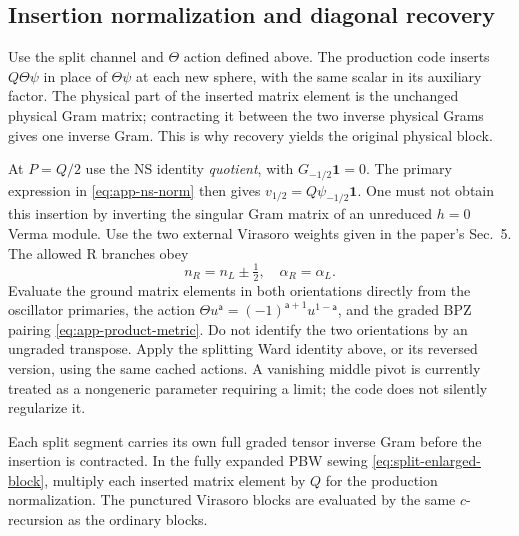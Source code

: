 \subsection{Insertion normalization and diagonal recovery}
\label{app:insertion}

Use the split channel and $\Theta$ action defined above. The
production code inserts $Q\Theta\psi$ in place of
$\Theta\psi$ at each new sphere, with the same scalar in its
auxiliary factor. The physical part of the inserted matrix element
is the unchanged physical Gram matrix;
contracting it between the two inverse physical Grams gives one inverse
Gram. This is why recovery yields the original physical block.

At $P=Q/2$ use the NS identity \emph{quotient}, with
$G_{-1/2}\mathbf1=0$. The primary expression in
\eqref{eq:app-ns-norm} then gives
$v_{1/2}=Q\psi_{-1/2}\mathbf1$. One must not obtain this insertion by
inverting the singular Gram matrix of an unreduced $h=0$ Verma module.
Use the two external Virasoro weights given in the paper's Sec.~5.
The allowed R branches obey
\begin{equation}
 n_R=n_L\pm\tfrac12,\quad\alpha_R=\alpha_L.
 \label{eq:app-insertion-branches}
\end{equation}
Evaluate the ground matrix elements in both orientations directly
from the oscillator primaries, the action
$\Theta u^{\mathsf a}=(-1)^{\mathsf a+1}u^{1-\mathsf a}$,
and the graded BPZ pairing \eqref{eq:app-product-metric}. Do not
identify the two orientations by an ungraded transpose. Apply
the splitting Ward identity above, or its
reversed version, using the same cached actions. A vanishing
middle pivot is currently treated as a nongeneric parameter requiring
a limit; the code does not silently regularize it.

Each split segment carries its own full graded tensor inverse Gram
before the insertion is contracted. In the fully expanded PBW sewing
\eqref{eq:split-enlarged-block}, multiply each inserted matrix element
by $Q$ for the production normalization. The punctured Virasoro blocks
are evaluated by the same $c$-recursion as the ordinary blocks.

